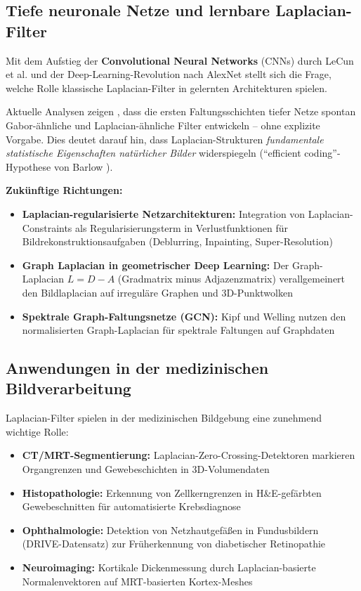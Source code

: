 ﻿\documentclass[a4paper,12pt]{article}
\theoremstyle{definition}
\begin{document}
\subsection{Tiefe neuronale Netze und lernbare Laplacian-Filter}

Mit dem Aufstieg der \textbf{Convolutional Neural Networks} (CNNs) durch LeCun et al. \cite{lecun1998}
und der Deep-Learning-Revolution nach AlexNet \cite{krizhevsky2012} stellt sich die Frage, welche
Rolle klassische Laplacian-Filter in gelernten Architekturen spielen.

Aktuelle Analysen zeigen \cite{zeiler2014}, dass die ersten Faltungsschichten tiefer Netze spontan
Gabor-ähnliche und Laplacian-ähnliche Filter entwickeln -- ohne explizite Vorgabe. Dies deutet
darauf hin, dass Laplacian-Strukturen \emph{fundamentale statistische Eigenschaften natürlicher
Bilder} widerspiegeln (``efficient coding''-Hypothese von Barlow \cite{barlow1961}).

\textbf{Zukünftige Richtungen:}
\begin{itemize}
    \item \textbf{Laplacian-regularisierte Netzarchitekturen:} Integration von Laplacian-Constraints
          als Regularisierungsterm in Verlustfunktionen für Bildrekonstruktionsaufgaben (Deblurring,
          Inpainting, Super-Resolution)
    \item \textbf{Graph Laplacian in geometrischer Deep Learning:} Der Graph-Laplacian $L = D - A$
          (Gradmatrix minus Adjazenzmatrix) verallgemeinert den Bildlaplacian auf irreguläre Graphen
          und 3D-Punktwolken \cite{bronstein2017}
    \item \textbf{Spektrale Graph-Faltungsnetze (GCN):} Kipf und Welling \cite{kipf2017} nutzen den
          normalisierten Graph-Laplacian für spektrale Faltungen auf Graphdaten
\end{itemize}

\subsection{Anwendungen in der medizinischen Bildverarbeitung}

Laplacian-Filter spielen in der medizinischen Bildgebung eine zunehmend wichtige Rolle:
\begin{itemize}
    \item \textbf{CT/MRT-Segmentierung:} Laplacian-Zero-Crossing-Detektoren markieren Organgrenzen
          und Gewebeschichten in 3D-Volumendaten
    \item \textbf{Histopathologie:} Erkennung von Zellkerngrenzen in H\&E-gefärbten Gewebeschnitten
          für automatisierte Krebsdiagnose
    \item \textbf{Ophthalmologie:} Detektion von Netzhautgefäßen in Fundusbildern (DRIVE-Datensatz)
          zur Früherkennung von diabetischer Retinopathie
    \item \textbf{Neuroimaging:} Kortikale Dickenmessung durch Laplacian-basierte Normalenvektoren
          auf MRT-basierten Kortex-Meshes \cite{jones2000}
\end{itemize}
\end{document}
